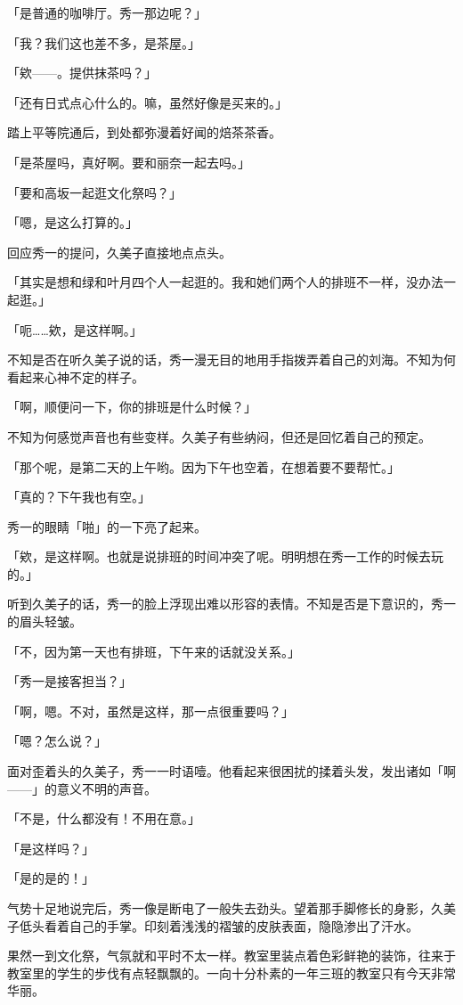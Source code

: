 \documentclass[UTF8]{ctexart}
\begin{document}
    「是普通的咖啡厅。秀一那边呢？」

    「我？我们这也差不多，是茶屋。」

    「欸——。提供抹茶吗？」

    「还有日式点心什么的。嘛，虽然好像是买来的。」

    踏上平等院通后，到处都弥漫着好闻的焙茶茶香。

    「是茶屋吗，真好啊。要和丽奈一起去吗。」

    「要和高坂一起逛文化祭吗？」

    「嗯，是这么打算的。」

    回应秀一的提问，久美子直接地点点头。

    「其实是想和绿和叶月四个人一起逛的。我和她们两个人的排班不一样，没办法一起逛。」

    「呃……欸，是这样啊。」

    不知是否在听久美子说的话，秀一漫无目的地用手指拨弄着自己的刘海。不知为何看起来心神不定的样子。

    「啊，顺便问一下，你的排班是什么时候？」

    不知为何感觉声音也有些变样。久美子有些纳闷，但还是回忆着自己的预定。

    「那个呢，是第二天的上午哟。因为下午也空着，在想着要不要帮忙。」

    「真的？下午我也有空。」

    秀一的眼睛「啪」的一下亮了起来。

    「欸，是这样啊。也就是说排班的时间冲突了呢。明明想在秀一工作的时候去玩的。」

    听到久美子的话，秀一的脸上浮现出难以形容的表情。不知是否是下意识的，秀一的眉头轻皱。

    「不，因为第一天也有排班，下午来的话就没关系。」

    「秀一是接客担当？」

    「啊，嗯。不对，虽然是这样，那一点很重要吗？」

    「嗯？怎么说？」

    面对歪着头的久美子，秀一一时语噎。他看起来很困扰的揉着头发，发出诸如「啊——」的意义不明的声音。

    「不是，什么都没有！不用在意。」

    「是这样吗？」

    「是的是的！」

    气势十足地说完后，秀一像是断电了一般失去劲头。望着那手脚修长的身影，久美子低头看着自己的手掌。印刻着浅浅的褶皱的皮肤表面，隐隐渗出了汗水。

    果然一到文化祭，气氛就和平时不太一样。教室里装点着色彩鲜艳的装饰，往来于教室里的学生的步伐有点轻飘飘的。一向十分朴素的一年三班的教室只有今天非常华丽。
\end{document}
